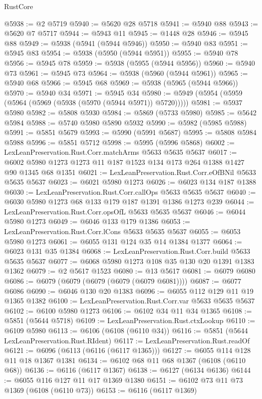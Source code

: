\begin{lexlean}{RustCore}
\begin{coremodule}
@5938 := @2 @5719
@5940 := @5620 @28 @5718
@5941 := @5940 @88
@5943 := @5620 @7 @5717
@5944 := @5943 @11
@5945 := @1448 @28
@5946 := @5945 @88
@5949 := @5938 (@5941 (@5944 @5946))
@5950 := @5940 @83
@5951 := @5945 @83
@5954 := @5938 (@5950 (@5944 @5951))
@5955 := @5940 @78
@5956 := @5945 @78
@5959 := @5938 (@5955 (@5944 @5956))
@5960 := @5940 @73
@5961 := @5945 @73
@5964 := @5938 (@5960 (@5944 @5961))
@5965 := @5940 @68
@5966 := @5945 @68
@5969 := @5938 (@5965 (@5944 @5966))
@5970 := @5940 @34
@5971 := @5945 @34
@5980 := @5949 (@5954 (@5959 (@5964 (@5969 (@5938 (@5970 (@5944 @5971)) @5720)))))
@5981 := @5937 @5980
@5982 := @5808 @5930
@5984 := @5869 (@5733 @5980)
@5985 := @5642 @5984
@5988 := @5740 @5980 @5890 @5932
@5990 := @5982 (@5985 @5988)
@5991 := @5851 @5679
@5993 := @5990 (@5991 @5687)
@5995 := @5808 @5984 @5988
@5996 := @5851 @5712
@5998 := @5995 (@5996 @5868)
@6002 := LexLeanPreservation.Rust.Corr.matchArms @5633 @5635 @5637
@6017 := @6002 @5980 @1273 @1273 @11 @187 @1523 @134 @173 @264 @1388 @1427 @90 @1345 @68 @1351
@6021 := LexLeanPreservation.Rust.Corr.eOfBNil @5633 @5635 @5637
@6023 := @6021 @5980 @1273
@6026 := @6023 @134 @187 @1388
@6030 := LexLeanPreservation.Rust.Corr.callOps @5633 @5635 @5637
@6040 := @6030 @5980 @1273 @68 @133 @179 @187 @1391 @1386 @1273 @239
@6044 := LexLeanPreservation.Rust.Corr.opsOfL @5633 @5635 @5637
@6046 := @6044 @5980 @1273
@6049 := @6046 @133 @179 @1386
@6053 := LexLeanPreservation.Rust.Corr.lCons @5633 @5635 @5637
@6055 := @6053 @5980 @1273
@6061 := @6055 @131 @124 @35 @14 @1384 @1377
@6064 := @6023 @131 @35 @1384
@6068 := LexLeanPreservation.Rust.Corr.build @5633 @5635 @5637
@6077 := @6068 @5980 @1273 @108 @35 @130 @20 @1391 @1383 @1362
@6079 := @2 @5617 @1523
@6080 := @13 @5617
@6081 := @6079 @6080
@6086 := @6079 (@6079 (@6079 (@6079 (@6079 @6081))))
@6087 := @6077 @6086
@6090 := @6046 @130 @20 @1383
@6096 := @6055 @112 @129 @11 @19 @1365 @1382
@6100 := LexLeanPreservation.Rust.Corr.var @5633 @5635 @5637
@6102 := @6100 @5980 @1273
@6106 := @6102 @34 @11 @34 @1365
@6108 := @5851 (@5644 @5718)
@6109 := LexLeanPreservation.Rust.ctxLookup
@6110 := @6109 @5980
@6113 := @6106 (@6108 (@6110 @34))
@6116 := @5851 (@5644 LexLeanPreservation.Rust.RIdent)
@6117 := LexLeanPreservation.Rust.readOf
@6121 := @6096 (@6113 (@6116 (@6117 @1365)))
@6127 := @6055 @114 @128 @11 @18 @1367 @1381
@6134 := @6102 @68 @11 @68 @1367 (@6108 (@6110 @68))
@6136 := @6116 (@6117 @1367)
@6138 := @6127 (@6134 @6136)
@6144 := @6055 @116 @127 @11 @17 @1369 @1380
@6151 := @6102 @73 @11 @73 @1369 (@6108 (@6110 @73))
@6153 := @6116 (@6117 @1369)

\end{coremodule}
\end{lexlean}
